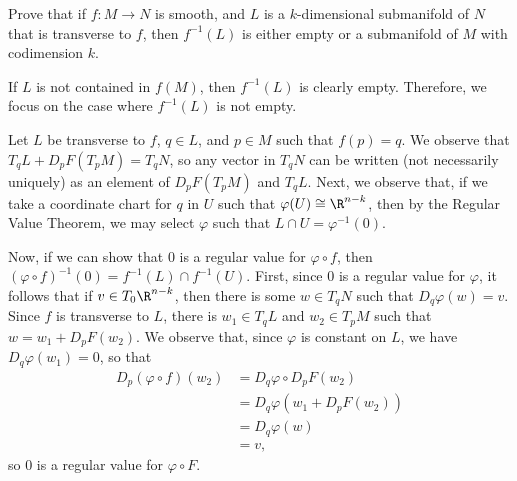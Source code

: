 \documentclass[10pt]{mypackage}
\begin{document}
\RaggedRight
\begin{problem}[Problem 1]
  Prove that if $f\colon M\rightarrow N$ is smooth, and $L$ is a $k$-dimensional submanifold of $N$ that is transverse to $f$, then $f^{-1}\left( L \right)$ is either empty or a submanifold of $M$ with codimension $k$.
\end{problem}
\begin{solution}
  If $L$ is not contained in $f(M)$, then $f^{-1}\left( L \right)$ is clearly empty. Therefore, we focus on the case where $f^{-1}\left( L \right)$ is not empty.\newline

  Let $L$ be transverse to $f$, $q\in L$, and $p\in M$ such that $f(p) = q$. We observe that $T_qL + D_pF\left( T_pM \right) = T_qN$, so any vector in $T_qN$ can be written (not necessarily uniquely) as an element of $D_pF\left( T_pM \right)$ and $T_qL$. Next, we observe that, if we take a coordinate chart for $q$ in $U$ such that $\varphi(U)\cong \R^{n-k}$, then by the Regular Value Theorem, we may select $\varphi$ such that $L\cap U = \varphi^{-1}\left( 0 \right)$.\newline

  Now, if we can show that $0$ is a regular value for $\varphi\circ f$, then $\left( \varphi\circ f \right)^{-1}\left( 0 \right) = f^{-1}\left( L \right)\cap f^{-1}\left( U \right)$. First, since $0$ is a regular value for $\varphi$, it follows that if $v\in T_0\R^{n-k}$, then there is some $w\in T_{q}N$ such that $D_{q}\varphi\left( w \right) = v$. Since $f$ is transverse to $L$, there is $w_1\in T_qL$ and $w_2\in T_pM$ such that $w = w_1 + D_{p}F\left( w_2 \right)$. We observe that, since $\varphi$ is constant on $L$, we have $D_q\varphi\left( w_1 \right) = 0$, so that
  \begin{align*}
    D_p\left( \varphi\circ f \right)\left( w_2 \right) &= D_q\varphi\circ D_pF\left( w_2 \right)\\
                                                       &= D_q\varphi\left( w_1 + D_pF\left( w_2 \right) \right)\\
                                                       &= D_q\varphi\left( w \right)\\
                                                       &= v,
  \end{align*}
  so $0$ is a regular value for $\varphi\circ F$.
\end{solution}
\end{document}
